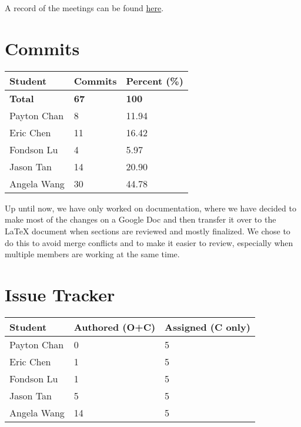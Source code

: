 \documentclass{article}
\begin{document}
A record of the meetings can be found
\href{https://github.com/PlutosCapstone/Plutos/issues?q=label%3Ameeting+is%3Aclosed}{here}.



\section{Commits}

\begin{table}[H]
\centering
\begin{tabular}{lll}
\toprule
\textbf{Student} & \textbf{Commits} & \textbf{Percent (\%)}\\
\midrule
\textbf{Total} & \textbf{67} & \textbf{100} \\
Payton Chan & 8 & 11.94\\
Eric Chen & 11 & 16.42\\
Fondson Lu & 4 & 5.97\\
Jason Tan & 14 & 20.90\\
Angela Wang & 30 & 44.78\\
\bottomrule
\end{tabular}
\end{table}

Up until now, we have only worked on documentation, where we have decided to
make most of the changes on a Google Doc and then transfer it over to the LaTeX
document when sections are reviewed and mostly finalized. We chose to do this to
avoid merge conflicts and to make it easier to review, especially when multiple
members are working at the same time.

\section{Issue Tracker}


\begin{table}[H]
\centering
\begin{tabular}{lll}
\toprule
\textbf{Student} & \textbf{Authored (O+C)} & \textbf{Assigned (C only)}\\
\midrule
Payton Chan & 0 & 5\\
Eric Chen & 1 & 5\\
Fondson Lu & 1 & 5\\
Jason Tan & 5 & 5\\
Angela Wang & 14 & 5\\
\bottomrule
\end{tabular}
\end{table}
\end{document}
